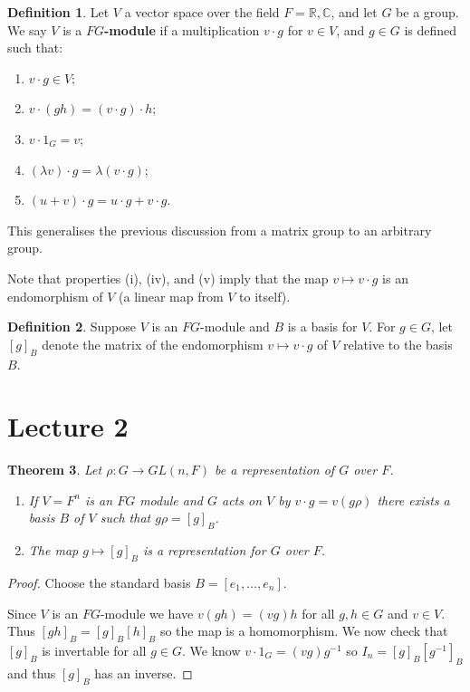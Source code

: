 \documentclass[11pt, notitlepage]{article}
\numberwithin{equation}{section}
\theoremstyle{plain}
\newtheorem{theorem}{Theorem}[section]
\theoremstyle{definition}
\newtheorem{definition}[theorem]{Definition}
\newcommand{\R}{\mathbb{R}}
\newcommand{\C}{\mathbb{C}}
\begin{document}
\begin{definition}
Let $V$ a vector space over the field $F = \R,\C$, and let $G$ be a group. We say $V$ is a \textbf{$FG$-module} if a multiplication $v \cdot g$ for $v \in V$, and $g \in G$ is defined such that:
\begin{enumerate}[label=(\roman*)]
    \item $v \cdot g \in V$;
    \item $v \cdot (gh) = (v \cdot g) \cdot h$;
    \item $v \cdot 1_G = v$;
    \item $(\lambda v) \cdot g = \lambda(v \cdot g)$;
    \item $(u + v) \cdot g = u \cdot g + v \cdot g$.
\end{enumerate}
\end{definition}

This generalises the previous discussion from a matrix group to an arbitrary group.

Note that properties (i), (iv), and (v) imply that the map $v \mapsto v \cdot g$ is an endomorphism of $V$ (a linear map from $V$ to itself).

\begin{definition}
Suppose $V$ is an $FG$-module and $B$ is a basis for $V$. For $g \in G$, let $[g]_B$ denote the matrix of the endomorphism $v \mapsto v \cdot g$ of $V$ relative to the basis $B$.
\end{definition}


\section{Lecture 2}


\begin{theorem}
Let $\rho: G \to GL(n,F)$ be a representation of $G$ over $F$.
	\begin{enumerate}[label=\emph{(\Roman*)}]
	\item If $V=F^n$ is an $FG$ module and $G$ acts on $V$ by $v \cdot g = v (g\rho)$ there exists a basis $B$ of $V$ such that $g\rho = [g]_B$.
	\item The map $g \mapsto [g]_B$ is a representation for $G$ over $F$.
\end{enumerate}
\end{theorem}

\begin{proof}
Choose the standard basis $B = [e_1, \ldots, e_n]$.

Since $V$ is an $FG$-module we have $v(gh) = (vg)h$ for all $g, h \in G$ and $v \in V$. Thus $[gh]_B = [g]_B [h]_B$ so the map is a homomorphism. We now check that $[g]_B$ is invertable for all $g \in G$. We know $v \cdot 1_G = (v g) g^{-1}$ so $I_n = [g]_B [g^{-1}]_B$ and thus $[g]_B$ has an inverse.
\end{proof}
\end{document}
